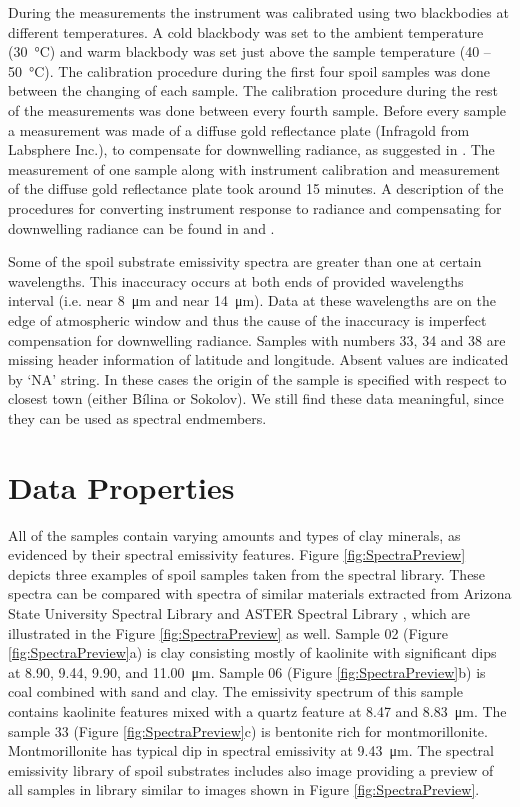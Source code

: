 \begin{appendices}
During the measurements the instrument was calibrated using two blackbodies at different temperatures. A cold blackbody was set to the ambient temperature (\SI{30}{\celsius}) and warm blackbody was set just above the sample temperature (40 -- \SI{50}{\celsius}). The calibration procedure during the first four spoil samples was done between the changing of each sample. The calibration procedure during the rest of the measurements was done between every fourth sample. Before every sample a measurement was made of a diffuse gold reflectance plate (Infragold from Labsphere Inc.), to compensate for downwelling radiance, as suggested in \cite{GV13}. The measurement of one sample along with instrument calibration and measurement of the diffuse gold reflectance plate took around 15 minutes. A description of the procedures for converting instrument response to radiance and compensating for downwelling radiance can be found in \cite{HJ98} and \cite{HK96}.

Some of the spoil substrate emissivity spectra are greater than one at certain wavelengths. This inaccuracy occurs at both ends of provided wavelengths interval (i.e. near \SI{8}{\micro\meter} and near \SI{14}{\micro\meter}). Data at these wavelengths are on the edge of atmospheric window and thus the cause of the inaccuracy is imperfect compensation for downwelling radiance. Samples with numbers 33, 34 and 38 are missing header information of latitude and longitude. Absent values are indicated by ‘NA’ string. In these cases the origin of the sample is specified with respect to closest town (either Bílina or Sokolov). We still find these data meaningful, since they can be used as spectral endmembers.


\section{Data Properties}

All of the samples contain varying amounts and types of clay minerals, as evidenced by their spectral emissivity features. Figure \ref{fig:SpectraPreview} depicts three examples of spoil samples taken from the spectral library. These spectra can be compared with spectra of similar materials extracted from Arizona State University Spectral Library \cite{CB00} and ASTER Spectral Library \cite{BH09}, which are illustrated in the Figure \ref{fig:SpectraPreview} as well. Sample 02 (Figure \ref{fig:SpectraPreview}a) is clay consisting mostly of kaolinite with significant dips at 8.90, 9.44, 9.90, and \SI{11.00}{\micro\meter}. Sample 06 (Figure \ref{fig:SpectraPreview}b) is coal combined with sand and clay. The emissivity spectrum of this sample contains kaolinite features mixed with a quartz feature at 8.47 and \SI{8.83}{\micro\meter}. The sample 33 (Figure \ref{fig:SpectraPreview}c) is bentonite rich for montmorillonite. Montmorillonite has typical dip in spectral emissivity at \SI{9.43}{\micro\meter}. The spectral emissivity library of spoil substrates includes also image providing a preview of all samples in library similar to images shown in Figure \ref{fig:SpectraPreview}.


\end{appendices}
